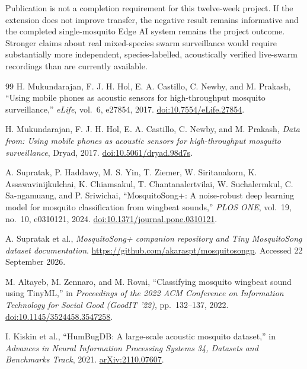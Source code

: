 \documentclass[a4paper,11pt]{article}
\begin{document}
Publication is not a completion requirement for this twelve-week project. If the extension does not improve transfer, the negative result remains informative and the completed single-mosquito Edge AI system remains the project outcome. Stronger claims about real mixed-species swarm surveillance would require substantially more independent, species-labelled, acoustically verified live-swarm recordings than are currently available.

\clearpage
{}
\begin{thebibliography}{99}
\small
{}
H. Mukundarajan, F. J. H. Hol, E. A. Castillo, C. Newby, and M. Prakash,
``Using mobile phones as acoustic sensors for high-throughput mosquito surveillance,''
\textit{eLife}, vol.~6, e27854, 2017.
\href{https://doi.org/10.7554/eLife.27854}{doi:10.7554/eLife.27854}.

H. Mukundarajan, F. J. H. Hol, E. A. Castillo, C. Newby, and M. Prakash,
\textit{Data from: Using mobile phones as acoustic sensors for high-throughput mosquito surveillance}, Dryad, 2017.
\href{https://doi.org/10.5061/dryad.98d7s}{doi:10.5061/dryad.98d7s}.

A. Supratak, P. Haddawy, M. S. Yin, T. Ziemer, W. Siritanakorn, K. Assawavinijkulchai, K. Chiamsakul, T. Chantanalertvilai, W. Suchalermkul, C. Sa-ngamuang, and P. Sriwichai,
``MosquitoSong+: A noise-robust deep learning model for mosquito classification from wingbeat sounds,''
\textit{PLOS ONE}, vol.~19, no.~10, e0310121, 2024.
\href{https://doi.org/10.1371/journal.pone.0310121}{doi:10.1371/journal.pone.0310121}.

A. Supratak et al., \textit{MosquitoSong+ companion repository and Tiny MosquitoSong dataset documentation}.
\url{https://github.com/akaraspt/mosquitosongp}. Accessed 22 September 2026.

M. Altayeb, M. Zennaro, and M. Rovai,
``Classifying mosquito wingbeat sound using TinyML,''
in \textit{Proceedings of the 2022 ACM Conference on Information Technology for Social Good (GoodIT '22)}, pp.~132--137, 2022.
\href{https://doi.org/10.1145/3524458.3547258}{doi:10.1145/3524458.3547258}.

I. Kiskin et al., ``HumBugDB: A large-scale acoustic mosquito dataset,''
in \textit{Advances in Neural Information Processing Systems 34, Datasets and Benchmarks Track}, 2021.
\href{https://arxiv.org/abs/2110.07607}{arXiv:2110.07607}.


\end{thebibliography}
\end{document}

